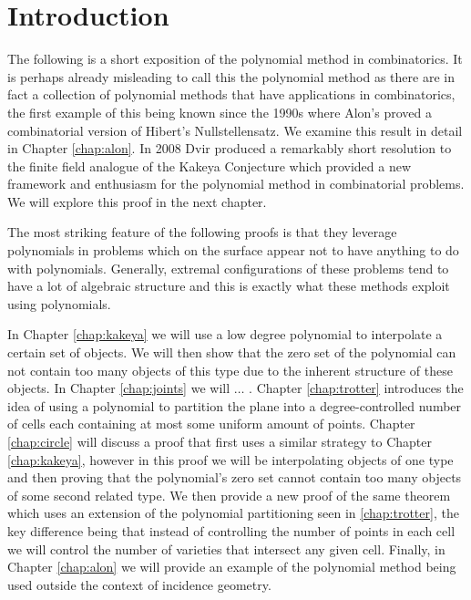 \chapter{Introduction}
The following is a short exposition of the polynomial method in combinatorics. 
It is perhaps already misleading to call this the polynomial method 
as there are in fact a collection of polynomial methods that have applications in combinatorics, the first example of this being known since the 1990s
where Alon's proved a combinatorial version of Hibert's Nullstellensatz.\cite{alon1999combinatorial} We examine this result in detail
in Chapter \ref{chap:alon}. In 2008 Dvir produced a remarkably short resolution to the finite field analogue of the Kakeya Conjecture which provided
a new framework and enthusiasm for the polynomial method in combinatorial problems.\cite{2008DVIR} We will explore this proof in the next chapter. 

The most striking feature of the following proofs is that they leverage polynomials in problems which on the surface appear not to have anything to 
do with polynomials. Generally, extremal configurations of these problems tend to have a lot of algebraic structure and this is exactly what these methods exploit using polynomials. 



In Chapter \ref{chap:kakeya} we will use a low degree polynomial to interpolate a certain set of objects. We will then show that the zero set of the polynomial can not contain 
too many objects of this type due to the inherent structure of these objects. In Chapter \ref{chap:joints} we will $\dots$ .
Chapter \ref{chap:trotter} introduces the idea of using a polynomial to partition the plane into a degree-controlled number of cells each containing at most some uniform amount of points.
Chapter \ref{chap:circle} will discuss a proof that first uses a similar strategy to Chapter \ref{chap:kakeya}, however in this proof we will be interpolating
objects of one type and then proving that the polynomial's zero set cannot contain too many objects of some second related type. 
We then provide a new proof of the same theorem which uses an extension of the polynomial partitioning seen in \ref{chap:trotter}, the key difference being that
instead of controlling the number of points in each cell we will control the number of varieties that intersect any given cell. Finally, in Chapter \ref{chap:alon} we will provide an example
of the polynomial method being used outside the context of incidence geometry.

